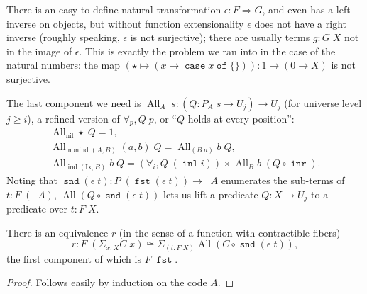 \documentclass[a4paper,UKenglish,cleveref,nameinlink,autoref,thm-restate]{lipics-v2019}
\newcommand{\one}{1}
\DeclareMathOperator{\case}{\mathtt{case}}
\newcommand{\caset}[2]{\case {#1}\;\mathtt{of}\;\{{#2}\}}
\DeclareMathOperator{\inl}{\mathtt{inl}}
\DeclareMathOperator{\inr}{\mathtt{inr}}
\DeclareMathOperator{\fst}{\mathtt{fst}}
\DeclareMathOperator{\snd}{\mathtt{snd}}
\DeclareMathOperator{\nonind}{nonind}
\DeclareMathOperator{\ind}{ind}
\DeclareMathOperator{\nil}{nil}
\newcommand{\Ix}{\mathrm{Ix}}
\DeclareMathOperator{\preEl}{\tilde{El}}
\DeclareMathOperator{\All}{All}
\newcommand{\splitequiv}{\hyperref[split-equiv]{r}}
\begin{document}
There is an easy-to-define natural transformation $\epsilon : F \Rightarrow G$, and even has a left inverse on objects, but without function extensionality $\epsilon$ does not have a right inverse (roughly speaking, $\epsilon$ is not surjective); there are usually terms $g : G\;X$ not in the image of $\epsilon$. This is exactly the problem we ran into in the case of the natural numbers: the map $(\star \mapsto (x \mapsto \caset{x}{})) : 1 \to (0 \to X)$ is not surjective.

The last component we need is $\All_A\;s : (Q : P_A\;s \to U_j) \to U_j$ (for universe level $j\geq i$), a refined version of $\forall_p, Q\;p$, or ``$Q$ holds at every position'':
\begin{gather}
\All_{\nil}\star\;Q = \one,\\
\All_{\nonind(A,B)}(a,b)\;Q = \All_{(B\;a)}b\;Q,\\
\All_{\ind(\Ix, B)}b\;Q = (\forall_i,Q\;(\inl i)) \times \All_{B}b\;(Q \circ \inr).
\end{gather}
Noting that $\snd (\epsilon\; t) : P\;(\fst (\epsilon\;t)) \to \preEl A$ enumerates the sub-terms of $t : F\;(\preEl A)$, $\All (Q \circ \snd (\epsilon\;t))$ lets us lift a predicate $Q : X \to U_j$ to a predicate over $t : F\;X$.
\begin{lemma}\label{split-equiv}There is an equivalence $\splitequiv$ (in the sense of a function with contractible fibers) \begin{equation}
\splitequiv : F\;(\Sigma_{x : X}C\;x) \cong \Sigma_{(t : F\;X)}\All (C\circ \snd (\epsilon\;t)),
\end{equation}
the first component of which is $F\;\fst$.
\end{lemma}
\begin{proof}
Follows easily by induction on the code $A$.
\end{proof}
\end{document}
